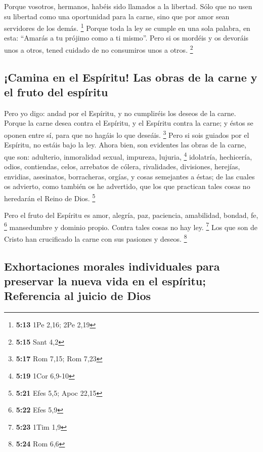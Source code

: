 Porque vosotros, hermanos, habéis sido llamados a la
libertad. Sólo que no usen su libertad como una oportunidad para la
carne, sino que por amor sean servidores de los demás. \footnote{\textbf{5:13}
  1Pe 2,16; 2Pe 2,19}  Porque toda la ley se cumple en
una sola palabra, en esta: ``Amarás a tu prójimo como a ti mismo''.
 Pero si os mordéis y os devoráis unos a otros, tened
cuidado de no consumiros unos a otros. \footnote{\textbf{5:15} Sant 4,2}

\hypertarget{camina-en-el-espuxedritu-las-obras-de-la-carne-y-el-fruto-del-espuxedritu}{%
\subsection{¡Camina en el Espíritu! Las obras de la carne y el fruto del
espíritu}\label{camina-en-el-espuxedritu-las-obras-de-la-carne-y-el-fruto-del-espuxedritu}}

 Pero yo digo: andad por el Espíritu, y no cumpliréis los
deseos de la carne.  Porque la carne desea contra el
Espíritu, y el Espíritu contra la carne; y éstos se oponen entre sí,
para que no hagáis lo que deseáis. \footnote{\textbf{5:17} Rom 7,15; Rom
  7,23}  Pero si sois guiados por el Espíritu, no estáis
bajo la ley.  Ahora bien, son evidentes las obras de la
carne, que son: adulterio, inmoralidad sexual, impureza, lujuria,
\footnote{\textbf{5:19} 1Cor 6,9-10}  idolatría,
hechicería, odios, contiendas, celos, arrebatos de cólera, rivalidades,
divisiones, herejías,  envidias, asesinatos, borracheras,
orgías, y cosas semejantes a éstas; de las cuales os advierto, como
también os he advertido, que los que practican tales cosas no heredarán
el Reino de Dios. \footnote{\textbf{5:21} Efes 5,5; Apoc 22,15}

 Pero el fruto del Espíritu es amor, alegría, paz,
paciencia, amabilidad, bondad, fe, \footnote{\textbf{5:22} Efes 5,9}
 mansedumbre y dominio propio. Contra tales cosas no hay
ley. \footnote{\textbf{5:23} 1Tim 1,9}  Los que son de
Cristo han crucificado la carne con sus pasiones y deseos. \footnote{\textbf{5:24}
  Rom 6,6}

\hypertarget{exhortaciones-morales-individuales-para-preservar-la-nueva-vida-en-el-espuxedritu-referencia-al-juicio-de-dios}{%
\subsection{Exhortaciones morales individuales para preservar la nueva
vida en el espíritu; Referencia al juicio de
Dios}\label{exhortaciones-morales-individuales-para-preservar-la-nueva-vida-en-el-espuxedritu-referencia-al-juicio-de-dios}}

